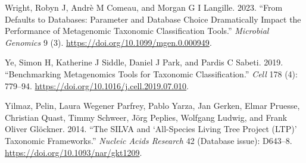 \documentclass[
]{article}
\newlength{\cslhangindent}
\newlength{\cslentryspacingunit} %
\newenvironment{CSLReferences}[2] %
 {%
  \setlength{\parindent}{0pt}
  \ifodd #1
  \let\oldpar\par
  \def\par{\hangindent=\cslhangindent\oldpar}
  \fi
  \setlength{\parskip}{#2\cslentryspacingunit}
 }%
 {}
\begin{document}
\begin{CSLReferences}{1}{0}
\leavevmode{}%
Wright, Robyn J, Andrè M Comeau, and Morgan G I Langille. 2023. {``From
Defaults to Databases: Parameter and Database Choice Dramatically Impact
the Performance of Metagenomic Taxonomic Classification Tools.''}
\emph{Microbial Genomics} 9 (3).
\url{https://doi.org/10.1099/mgen.0.000949}.

\leavevmode{}%
Ye, Simon H, Katherine J Siddle, Daniel J Park, and Pardis C Sabeti.
2019. {``Benchmarking Metagenomics Tools for Taxonomic
Classification.''} \emph{Cell} 178 (4): 779--94.
\url{https://doi.org/10.1016/j.cell.2019.07.010}.

\leavevmode{}%
Yilmaz, Pelin, Laura Wegener Parfrey, Pablo Yarza, Jan Gerken, Elmar
Pruesse, Christian Quast, Timmy Schweer, Jörg Peplies, Wolfgang Ludwig,
and Frank Oliver Glöckner. 2014. {``The {SILVA} and {`All-Species Living
Tree Project ({LTP})'} Taxonomic Frameworks.''} \emph{Nucleic Acids
Research} 42 (Database issue): D643--8.
\url{https://doi.org/10.1093/nar/gkt1209}.

\end{CSLReferences}
\end{document}
